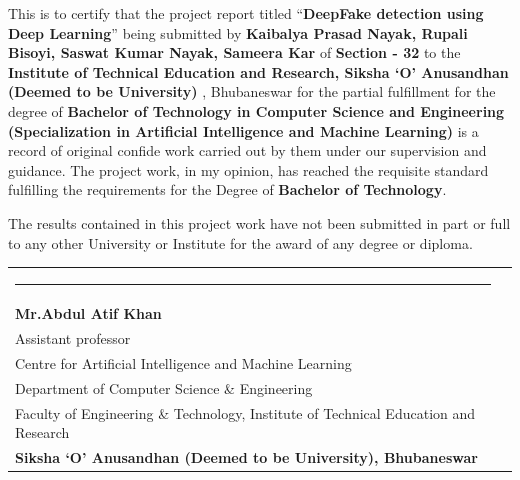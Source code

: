 \documentclass[12pt,a4paper]{report}
\begin{document}
\noindent This is to certify that the project report titled “\textbf{DeepFake detection using Deep Learning}” being submitted by \textbf{Kaibalya Prasad Nayak, Rupali Bisoyi, Saswat Kumar Nayak, Sameera Kar} of \textbf{Section - 32} to the \textbf{Institute of Technical Education and Research, Siksha ‘O’ Anusandhan (Deemed to be University) }, Bhubaneswar for the partial fulfillment for the degree of \textbf{Bachelor of Technology in Computer Science and Engineering (Specialization in Artificial Intelligence and Machine Learning)} is a record of original confide work carried out by them under our supervision and guidance. The project work, in my opinion, has reached the requisite standard fulfilling the requirements for the Degree of \textbf{Bachelor of Technology}. 

\noindent The results contained in this project work have not been submitted in part or full to any other University or Institute for the award of any degree or diploma.

\vfill{}

\noindent\begin{tabular}{p{15cm} p{0.0cm}}
\rule{6.2cm}{0.5pt} & \\
\textbf{Mr.Abdul Atif Khan} &\\
Assistant professor &\\
Centre for Artificial Intelligence and Machine Learning &\\
Department of Computer Science \& Engineering &\\
Faculty of Engineering \& Technology, Institute of Technical Education and Research &\\
\textbf{Siksha `O' Anusandhan (Deemed to be University),  Bhubaneswar}
&\\

\end{tabular}
\end{document}

